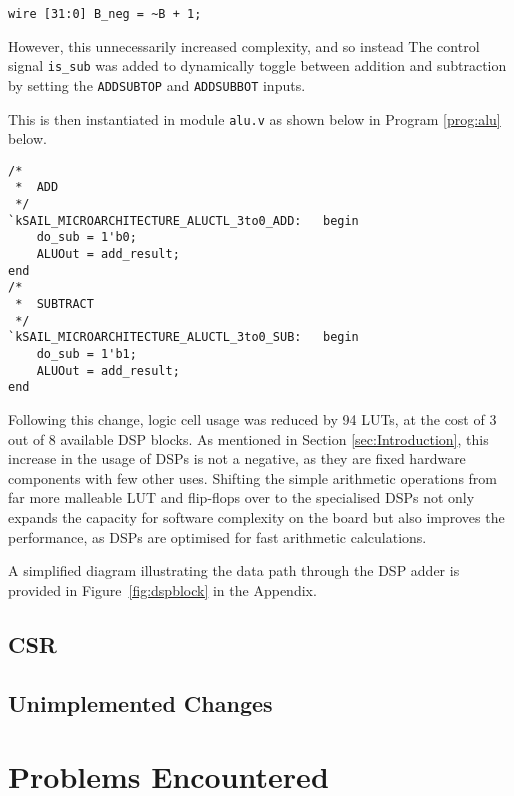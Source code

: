 \documentclass[a4paper,10pt]{article}
\begin{document}
\begin{lstlisting}[style=verilog-style, caption=
    {2s compliment}, label={prog:2s_complement}]
wire [31:0] B_neg = ~B + 1;
\end{lstlisting}

However, this unnecessarily increased complexity, and so instead
The control signal \texttt{is\_sub} was added to dynamically toggle between 
addition and subtraction by setting the 
\texttt{ADDSUBTOP} and \texttt{ADDSUBBOT} inputs. 

This is then instantiated in module \texttt{alu.v}
as shown below in Program \ref{prog:alu} below.

\begin{lstlisting}[style=verilog-style, caption=
    {is\_sub implementation within alu.v}, label={prog:alu}]
/*
 *	ADD
 */
`kSAIL_MICROARCHITECTURE_ALUCTL_3to0_ADD:	begin
	do_sub = 1'b0;
	ALUOut = add_result;
end
/*
 *	SUBTRACT
 */
`kSAIL_MICROARCHITECTURE_ALUCTL_3to0_SUB:	begin
	do_sub = 1'b1;
	ALUOut = add_result;
end
\end{lstlisting}

\iffalse
Initial problems with carry over
\fi
Following this change, logic cell usage was reduced by 94 LUTs, 
at the cost of 3 out of 8 available DSP blocks. 
As mentioned in Section \ref{sec:Introduction},
this increase in the usage of DSPs is not a negative,
as they are fixed hardware components with few other uses.
Shifting the simple arithmetic operations from 
far more malleable LUT and flip-flops over to the specialised DSPs
not only expands the capacity for software complexity on the board
but also improves the performance,
as DSPs are optimised for fast arithmetic calculations.

A simplified diagram illustrating the data path through the DSP adder 
is provided in Figure~\ref{fig:dspblock} in the Appendix.

\subsection{CSR}
\label{sec:CSR}

\subsection{Unimplemented Changes}
\label{sec:Unimplemented_Changes}

\section{Problems Encountered}
\label{sec:Problems_Encountered}
\end{document}
